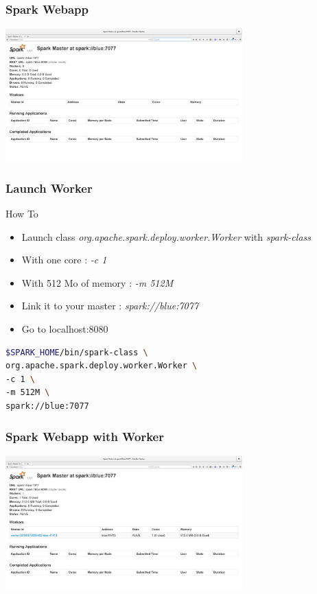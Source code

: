 \documentclass[slidetop,9pt,utf8]{beamer}
\begin{document}
\begin{frame}

  \frametitle{Spark Webapp}

  \includegraphics[width=345px]{images/spark_webapp.png}

\end{frame}

\begin{frame}[fragile]

  \frametitle{Launch Worker}

  \begin{block}{How To}
    \begin{itemize}
      \item Launch class \textit{org.apache.spark.deploy.worker.Worker} with \textit{spark-class}
      \item With one core : \textit{-c 1}
      \item With 512 Mo of memory : \textit{-m 512M}
      \item Link it to your master : \textit{spark://blue:7077}
      \item Go to localhost:8080
    \end{itemize}
  \end{block}

  \begin{lstlisting}[language=bash, style=terminal-large]
$SPARK_HOME/bin/spark-class \
org.apache.spark.deploy.worker.Worker \
-c 1 \
-m 512M \
spark://blue:7077
  \end{lstlisting} 

\end{frame}

\begin{frame}

  \frametitle{Spark Webapp with Worker}

  \includegraphics[width=345px]{images/spark_webapp_with_worker.png}

\end{frame}
\end{document}
